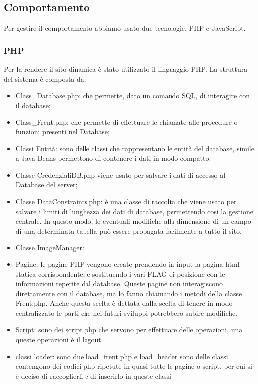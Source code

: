 \documentclass[1_relazione.tex]{subfiles}
\begin{document}
\subsection{Comportamento}
Per gestire il comportamento abbiamo usato due tecnologie, PHP e JavaScript.

\subsubsection{PHP}
Per la rendere il sito dinamica \`{e} stato utilizzato il linguaggio PHP.
La struttura del sistema \`{e} composta da:
\begin{itemize}
    \item Class_Database.php: che permette, dato un comando SQL, di interagire con il database;
    \item Class_Frent.php: che permette di effettuare le chiamate alle procedure o funzioni presenti nel Database;
    \item Classi Entit\`{a}: sono delle classi che rappresentano le entit\`{a} del database, simile a Java Beans permettono di contenere i dati in modo compatto.
    \item Classe CredenzialiDB.php viene usato per salvare i dati di accesso al Database del server;
    \item Classe DataConstraints.php: \`{e} una classe di raccolta che viene usato per salvare i limiti di lunghezza dei dati di database, permettendo cos\`{i} la gestione centrale. In questo modo, le eventuali modifiche alla dimensione di un campo di una determinata tabella pu\`{o} essere propagata facilmente a tutto il sito.
    \item Classe ImageManager: %
    \item Pagine: le pagine PHP vengono create prendendo in input la pagina html statica corrispondente, e  sostituendo i vari FLAG di posizione con le informazioni reperite dal database. Queste pagine non interagiscono direttamente con il database, ma lo fanno chiamando i metodi della classe Frent.php. Anche questa scelta \`{e} dettata dalla scelta di tenere in modo centralizzato le parti che nei futuri sviluppi potrebbero subire modifiche.
    \item  Script: sono dei script php che servono per effettuare delle operazioni, una queste operazioni \`{e} il logout.
    \item classi loader: sono due load_frent.php e load_header sono delle classi contengono dei codici php ripetute in quasi tutte le pagine o script, per cui si \`{e} deciso di raccoglierli e di inserirlo in queste classi.
\end{itemize}
\end{document}
